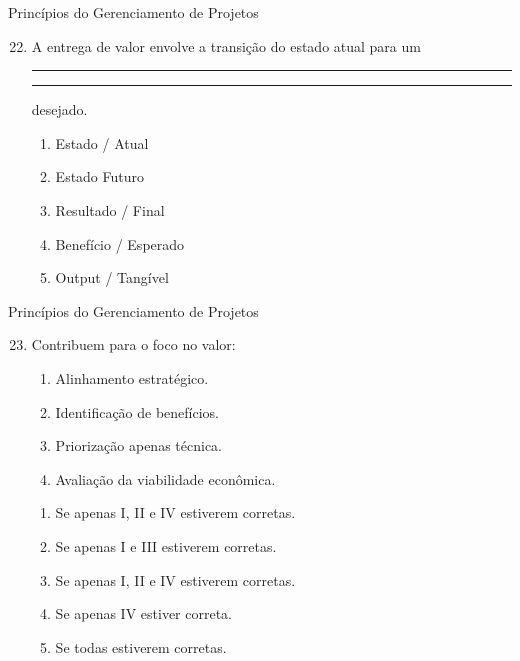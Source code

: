 \documentclass{beamer}
\begin{document}
\begin{frame}{Princípios do Gerenciamento de Projetos}
	\begin{enumerate}
		\setcounter{enumi}{21}
		\justifying
		\item A entrega de valor envolve a transição do estado atual para um \rule{60pt}{1pt} \rule{60pt}{1pt} desejado.
		\begin{enumerate}[a]
			\item Estado / Atual
			\item \alert<2>{Estado Futuro}
			\item Resultado / Final
			\item Benefício / Esperado
			\item Output / Tangível
		\end{enumerate}
	\end{enumerate}
\end{frame}

\begin{frame}{Princípios do Gerenciamento de Projetos}
	\begin{enumerate}
		\setcounter{enumi}{22}
		\justifying
		\item Contribuem para o foco no valor:
		\begin{enumerate}[I]
			\item Alinhamento estratégico.
			\item Identificação de benefícios.
			\item Priorização apenas técnica.
			\item Avaliação da viabilidade econômica.
		\end{enumerate}
		\begin{enumerate}[a]
			\item Se apenas I, II e IV estiverem corretas.
			\item Se apenas I e III estiverem corretas.
			\item \alert<2>{Se apenas I, II e IV estiverem corretas.}
			\item Se apenas IV estiver correta.
			\item Se todas estiverem corretas.
		\end{enumerate}
	\end{enumerate}
\end{frame}
\end{document}
